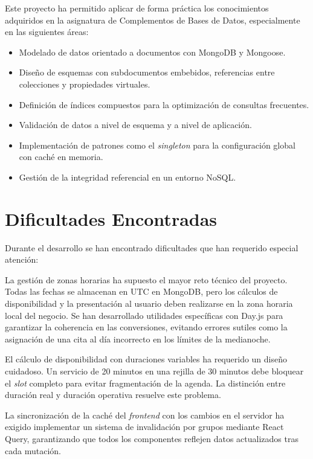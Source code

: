 Este proyecto ha permitido aplicar de forma pr\'actica los conocimientos adquiridos en la asignatura de Complementos de Bases de Datos, especialmente en las siguientes \'areas:

\begin{itemize}
    \item Modelado de datos orientado a documentos con MongoDB y Mongoose.
    \item Dise\~no de esquemas con subdocumentos embebidos, referencias entre colecciones y propiedades virtuales.
    \item Definici\'on de \'indices compuestos para la optimizaci\'on de consultas frecuentes.
    \item Validaci\'on de datos a nivel de esquema y a nivel de aplicaci\'on.
    \item Implementaci\'on de patrones como el \textit{singleton} para la configuraci\'on global con cach\'e en memoria.
    \item Gesti\'on de la integridad referencial en un entorno NoSQL.
\end{itemize}

\section{Dificultades Encontradas}\label{sec:dificultades}

Durante el desarrollo se han encontrado dificultades que han requerido especial atenci\'on:

La gesti\'on de zonas horarias ha supuesto el mayor reto t\'ecnico del proyecto. Todas las fechas se almacenan en UTC en MongoDB, pero los c\'alculos de disponibilidad y la presentaci\'on al usuario deben realizarse en la zona horaria local del negocio. Se han desarrollado utilidades espec\'ificas con Day.js para garantizar la coherencia en las conversiones, evitando errores sutiles como la asignaci\'on de una cita al d\'ia incorrecto en los l\'imites de la medianoche.

El c\'alculo de disponibilidad con duraciones variables ha requerido un dise\~no cuidadoso. Un servicio de 20 minutos en una rejilla de 30 minutos debe bloquear el \textit{slot} completo para evitar fragmentaci\'on de la agenda. La distinci\'on entre duraci\'on real y duraci\'on operativa resuelve este problema.

La sincronizaci\'on de la cach\'e del \textit{frontend} con los cambios en el servidor ha exigido implementar un sistema de invalidaci\'on por grupos mediante React Query, garantizando que todos los componentes reflejen datos actualizados tras cada mutaci\'on.

